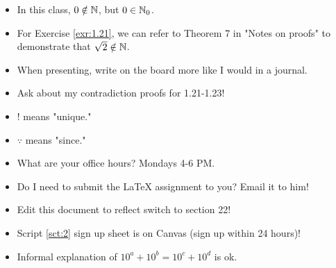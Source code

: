\documentclass[titlepage]{report}
\begin{document}
\begin{itemize}
\begin{itemize}
    \end{itemize}
    \item In this class, $0\notin\mathbb{N}$, but $0\in\mathbb{N}_0$.
    \item For Exercise \ref{exr:1.21}, we can refer to Theorem 7 in "Notes on proofs" to demonstrate that $\sqrt{2}\notin\mathbb{N}$.
    \item When presenting, write on the board more like I would in a journal.
    \item Ask about my contradiction proofs for 1.21-1.23!
    \item {}! means "unique."
    \item $\because$ means "since."
    \item {}What are your office hours? Mondays 4-6 PM.
    \item Do I need to submit the LaTeX assignment to you? Email it to him!
    \item Edit this document to reflect switch to section 22!
    \item Script \ref{sct:2} sign up sheet is on Canvas (sign up within 24 hours)!
    \item {}Informal explanation of $10^a+10^b=10^c+10^d$ is ok.
\end{itemize}




\end{document}
